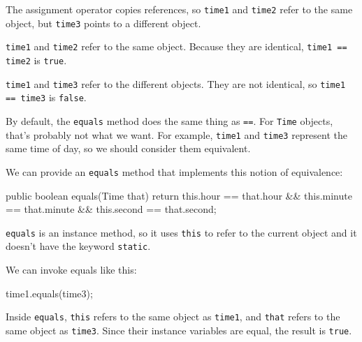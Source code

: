 \documentclass[12pt]{book}
\theoremstyle{exercise}
\newcommand{\java}[1]{\verb"#1"}
\newcommand{\java}[1]{\lstinline{#1}} %
\begin{document}
The assignment operator copies references, so \java{time1} and \java{time2} refer to the same object, but \java{time3} points to a different object.

\java{time1} and \java{time2} refer to the same object.
Because they are identical, \java{time1 == time2} is \java{true}.

\java{time1} and \java{time3} refer to the different objects.
They are not identical, so \java{time1 == time3} is \java{false}.

By default, the \java{equals} method does the same thing as \java{==}.
For \java{Time} objects, that's probably not what we want.
For example, \java{time1} and \java{time3} represent the same time of day, so we should consider them equivalent.


We can provide an \java{equals} method that implements this notion of equivalence:

\begin{code}
    public boolean equals(Time that) {
        return this.hour == that.hour
            && this.minute == that.minute
            && this.second == that.second;
    }
\end{code}

\java{equals} is an instance method, so it uses \java{this} to refer to the current object and it doesn't have the keyword \java{static}.

We can invoke equals like this:

\begin{code}
    time1.equals(time3);
\end{code}

Inside \java{equals}, \java{this} refers to the same object as \java{time1}, and \java{that} refers to the same object as \java{time3}.
Since their instance variables are equal, the result is \java{true}.



\end{document}

